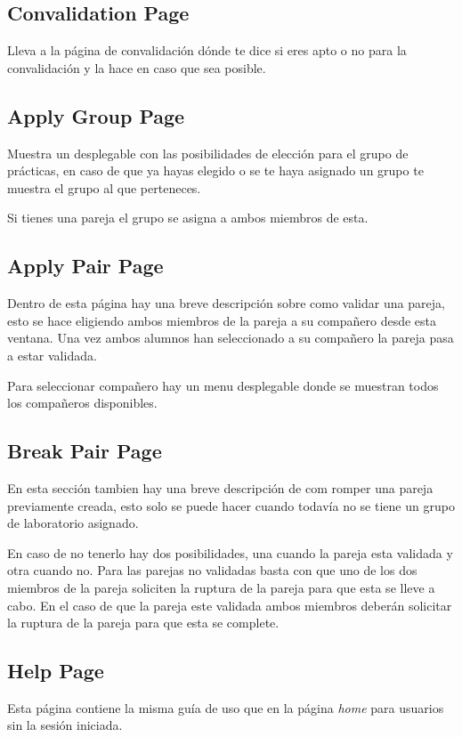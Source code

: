 \documentclass{article}
\begin{document}
\subsection*{Convalidation Page}

Lleva a la página de convalidación dónde te dice si eres apto o no para la convalidación y la hace en caso
que sea posible.


\subsection*{Apply Group Page}

Muestra un desplegable con las posibilidades de elección para el grupo de prácticas, en caso de que ya hayas
elegido o se te haya asignado un grupo te muestra el grupo al que perteneces.

Si tienes una pareja el grupo se asigna a ambos miembros de esta.


\subsection*{Apply Pair Page}

Dentro de esta página hay una breve descripción sobre como validar una pareja, esto se hace eligiendo ambos miembros
de la pareja a su compañero desde esta ventana. Una vez ambos alumnos han seleccionado a su compañero la pareja pasa 
a estar validada.

Para seleccionar compañero hay un menu desplegable donde se muestran todos los compañeros disponibles.


\subsection*{Break Pair Page}

En esta sección tambien hay una breve descripción de com romper una pareja previamente creada, esto solo se puede
hacer cuando todavía no se tiene un grupo de laboratorio asignado.

En caso de no tenerlo hay dos posibilidades, una cuando la pareja esta validada y otra cuando no. Para las parejas
no validadas basta con que uno de los dos miembros de la pareja soliciten la ruptura de la pareja para que esta se
lleve a cabo. En el caso de que la pareja este validada ambos miembros deberán solicitar la ruptura de la pareja para
que esta se complete.


\subsection*{Help Page}

Esta página contiene la misma guía de uso que en la página \textit{home} para usuarios sin la sesión iniciada.
\end{document}
